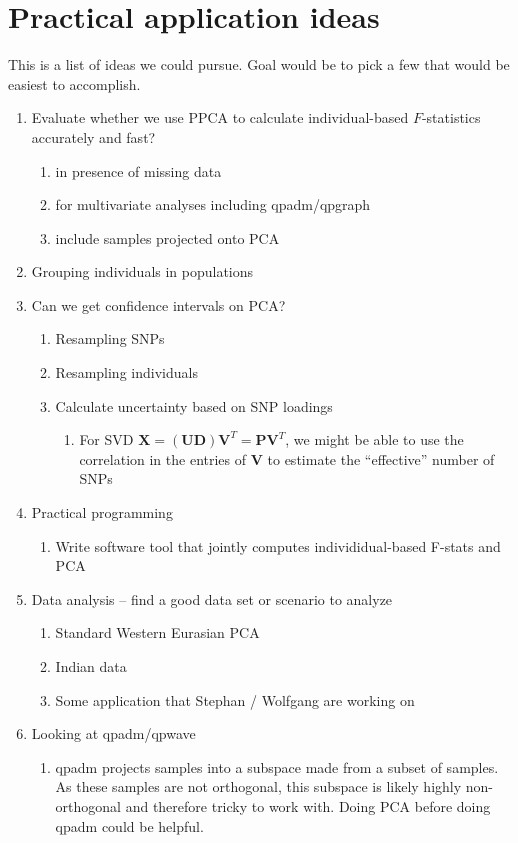 \documentclass[12pt, letterpaper]{article}
\begin{document}
\section{Practical application ideas}
This is a list of ideas we could pursue. Goal would be to pick a few that would be easiest to accomplish.
\begin{enumerate}
    \item Evaluate whether we use PPCA to calculate individual-based $F$-statistics accurately and fast?
    \begin{enumerate}
        \item in presence of missing data
        \item for multivariate analyses including qpadm/qpgraph
        \item include samples projected onto PCA
    \end{enumerate}
    \item Grouping individuals in populations
    
    \item Can we get confidence intervals on PCA?
        \begin{enumerate}
            \item Resampling SNPs
            \item Resampling individuals
            \item Calculate uncertainty based on SNP loadings
            \begin{enumerate}
                \item For SVD $\mathbf{X} = \mathbf{(UD)V}^T = \mathbf{PV}^T$, we might be able to use the correlation in the entries of $\mathbf{V}$ to estimate the ``effective'' number of SNPs
            \end{enumerate}
        \end{enumerate}
    \item Practical programming
        \begin{enumerate}
            \item Write software tool that jointly computes individidual-based F-stats and PCA
        \end{enumerate}
    \item Data analysis -- find a good data set or scenario to analyze
        \begin{enumerate}
            \item Standard Western Eurasian PCA
            \item Indian data
            \item Some application that Stephan / Wolfgang are working on
        \end{enumerate}
    \item Looking at qpadm/qpwave
        \begin{enumerate}
            \item qpadm projects samples into a subspace made from a subset of samples. As these samples are not orthogonal, this subspace is likely highly non-orthogonal and therefore tricky to work with. Doing PCA before doing qpadm could be helpful. 
        \end{enumerate}        
\end{enumerate}
\end{document}
